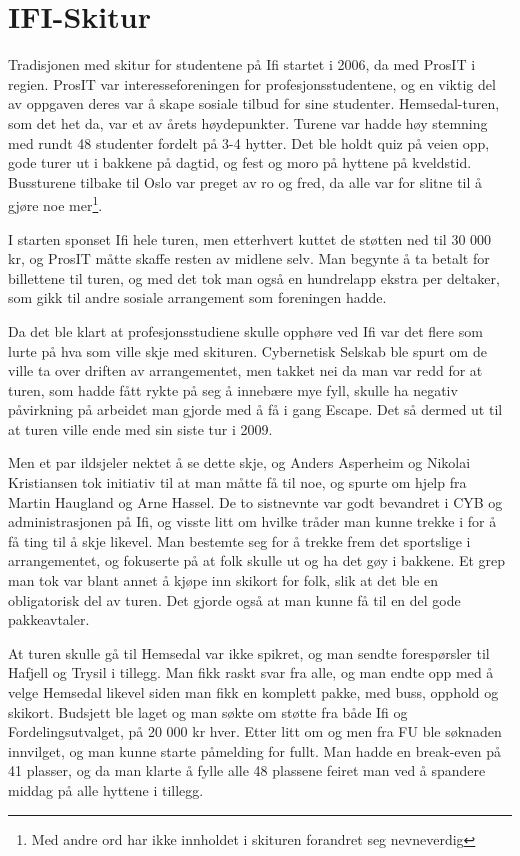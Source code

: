 \chapter{IFI-Skitur}

\author{Skrevet av Arne Hassel}

Tradisjonen med skitur for studentene på Ifi startet i 2006, da med ProsIT i regien. ProsIT var interesseforeningen for profesjonsstudentene, og en viktig del av oppgaven deres var å skape sosiale tilbud for sine studenter. Hemsedal-turen, som det het da, var et av årets høydepunkter. Turene var hadde høy stemning med rundt 48 studenter fordelt på 3-4 hytter. Det ble holdt quiz på veien opp, gode turer ut i bakkene på dagtid, og fest og moro på hyttene på kveldstid. Bussturene tilbake til Oslo var preget av ro og fred, da alle var for slitne til å gjøre noe mer\footnote{Med andre ord har ikke innholdet i skituren forandret seg nevneverdig}.

I starten sponset Ifi hele turen, men etterhvert kuttet de støtten ned til 30 000 kr, og ProsIT måtte skaffe resten av midlene selv. Man begynte å ta betalt for billettene til turen, og med det tok man også en hundrelapp ekstra per deltaker, som gikk til andre sosiale arrangement som foreningen hadde.

Da det ble klart at profesjonsstudiene skulle opphøre ved Ifi var det flere som lurte på hva som ville skje med skituren. Cybernetisk Selskab ble spurt om de ville ta over driften av arrangementet, men takket nei da man var redd for at turen, som hadde fått rykte på seg å innebære mye fyll, skulle ha negativ påvirkning på arbeidet man gjorde med å få i gang Escape. Det så dermed ut til at turen ville ende med sin siste tur i 2009.

Men et par ildsjeler nektet å se dette skje, og Anders Asperheim og Nikolai Kristiansen tok initiativ til at man måtte få til noe, og spurte om hjelp fra Martin Haugland og Arne Hassel. De to sistnevnte var godt bevandret i CYB og administrasjonen på Ifi, og visste litt om hvilke tråder man kunne trekke i for å få ting til å skje likevel. Man bestemte seg for å trekke frem det sportslige i arrangementet, og fokuserte på at folk skulle ut og ha det gøy i bakkene. Et grep man tok var blant annet å kjøpe inn skikort for folk, slik at det ble en obligatorisk del av turen. Det gjorde også at man kunne få til en del gode pakkeavtaler.

At turen skulle gå til Hemsedal var ikke spikret, og man sendte forespørsler til Hafjell og Trysil i tillegg. Man fikk raskt svar fra alle, og man endte opp med å velge Hemsedal likevel siden man fikk en komplett pakke, med buss, opphold og skikort. Budsjett ble laget og man søkte om støtte fra både Ifi og Fordelingsutvalget, på 20 000 kr hver. Etter litt om og men fra FU ble søknaden innvilget, og man kunne starte påmelding for fullt. Man hadde en break-even på 41 plasser, og da man klarte å fylle alle 48 plassene feiret man ved å spandere middag på alle hyttene i tillegg.

